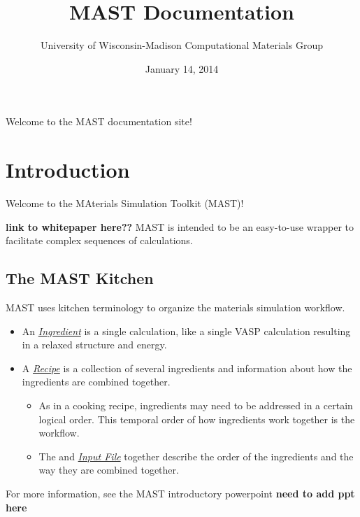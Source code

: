 \documentclass[letterpaper,10pt,english]{sphinxmanual}
\title{MAST Documentation}
\date{January 14, 2014}
\author{University of Wisconsin-Madison Computational Materials Group}
\begin{document}
\maketitle
\tableofcontents
{}\label{index::doc}


Welcome to the MAST documentation site!


\chapter{Introduction}
\label{0_0_introduction:introduction}\label{0_0_introduction::doc}\label{0_0_introduction:materials-simulation-toolkit-mast-documentation}
Welcome to the MAterials Simulation Toolkit (MAST)!

\textbf{link to whitepaper here??}
MAST is intended to be an easy-to-use wrapper to facilitate complex sequences of calculations.


\section{The MAST Kitchen}
\label{0_0_introduction:the-mast-kitchen}
MAST uses kitchen terminology to organize the materials simulation workflow.
\begin{itemize}
\item {} 
An {\hyperref[2_0_ingredients::doc]{\emph{Ingredient}}} is a single calculation, like a single VASP calculation resulting in a relaxed structure and energy.

\item {} 
A {\hyperref[4_0_recipe::doc]{\emph{Recipe}}} is a collection of several ingredients and information about how the ingredients are combined together.
\begin{itemize}
\item {} 
As in a cooking recipe, ingredients may need to be addressed in a certain logical order. This temporal order of how ingredients work together is the workflow.

\item {} 
The  and {\hyperref[3_0_inputfile::doc]{\emph{Input File}}} together describe the order of the ingredients and the way they are combined together.

\end{itemize}

\end{itemize}

For more information, see the MAST introductory powerpoint \textbf{need to add ppt here}
\end{document}
